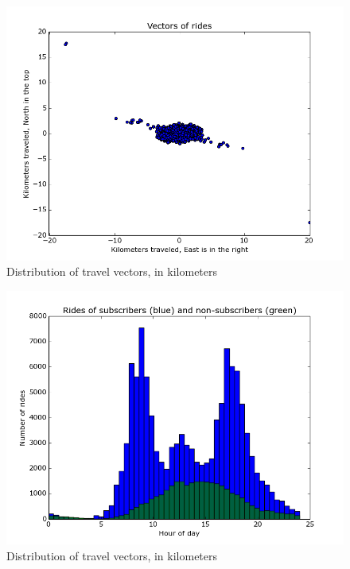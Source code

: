 \documentclass{article}
\begin{document}
\begin{figure}
	\centering
	\includegraphics[width=\textwidth]{../travel_vector.png}
	\caption{Distribution of travel vectors, in kilometers}
	\label{fig:travelvector}
\end{figure}

\begin{figure}
	\centering
	\includegraphics[width=\textwidth]{../time_of_day_sub_not_sub.png}
	\caption{Distribution of travel vectors, in kilometers}
	\label{fig:sns}
\end{figure}
\end{document}
